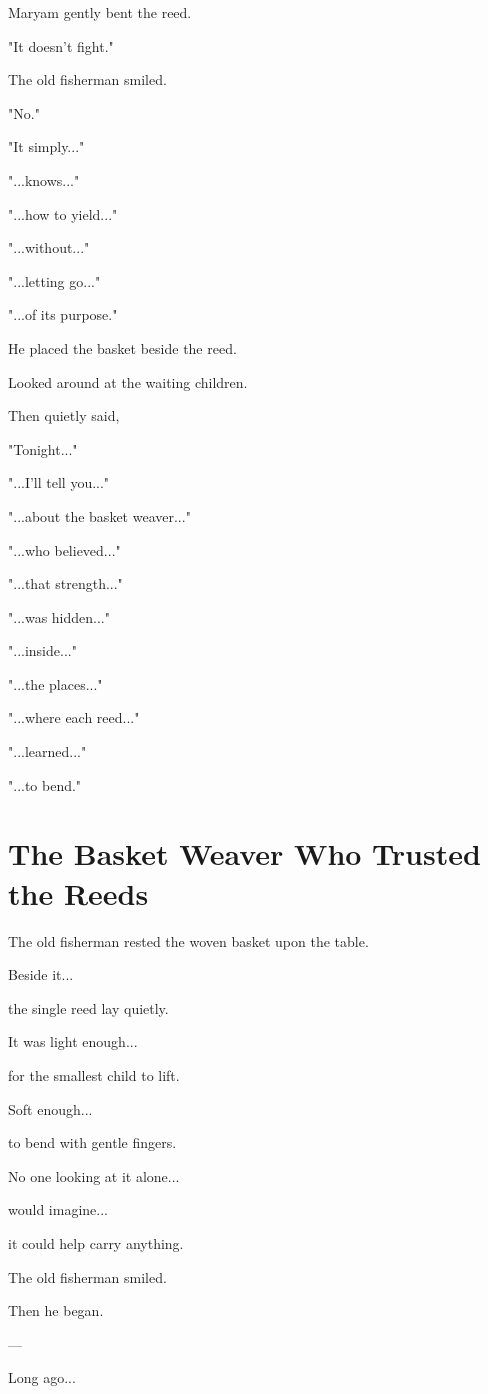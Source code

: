 \documentclass[12pt,openany]{book}
\begin{document}
Maryam gently bent the reed.

"It doesn't fight."

The old fisherman smiled.

"No."

"It simply..."

"...knows..."

"...how to yield..."

"...without..."

"...letting go..."

"...of its purpose."

He placed the basket beside the reed.

Looked around at the waiting children.

Then quietly said,

"Tonight..."

"...I'll tell you..."

"...about the basket weaver..."

"...who believed..."

"...that strength..."

"...was hidden..."

"...inside..."

"...the places..."

"...where each reed..."

"...learned..."

"...to bend."
\section*{The Basket Weaver Who Trusted the Reeds}

The old fisherman rested the woven basket upon the table.

Beside it...

the single reed lay quietly.

It was light enough...

for the smallest child to lift.

Soft enough...

to bend with gentle fingers.

No one looking at it alone...

would imagine...

it could help carry anything.

The old fisherman smiled.

Then he began.

---

Long ago...
\end{document}
